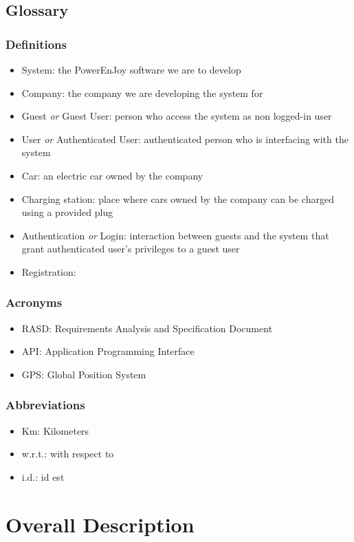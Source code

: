 \subsection{Glossary}
	\subsubsection{Definitions}
	\begin{itemize}
		\item System: the PowerEnJoy software we are to develop
		\item Company: the company we are developing the system for
		\item Guest \emph{or} Guest User: person who access the system as non logged-in user
		\item User \emph{or} Authenticated User: authenticated person who is interfacing with the system
		\item Car: an electric car owned by the company
		\item Charging station: place where cars owned by the company can be charged using a provided plug
		\item Authentication \emph{or} Login: interaction between guests and the system that grant authenticated user's privileges to a guest user
		\item Registration: 
	\end{itemize}
\subsubsection{Acronyms}
	\begin{itemize}
		\item RASD: Requirements Analysis and Specification Document
		\item API: Application Programming Interface
		\item GPS: Global Position System
	\end{itemize}
\subsubsection{Abbreviations}
	\begin{itemize}
		\item Km: Kilometers
		\item w.r.t.: with respect to
		\item i.d.: id est
	\end{itemize}

\section{Overall Description}
